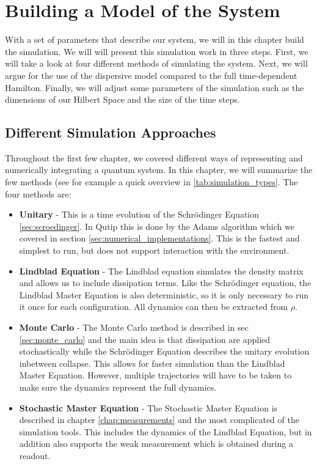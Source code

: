 \chapter{Building a Model of the System}\label{chap:model}
With a set of parameters that describe our system, we will in this chapter build  the simulation. We will will present this simulation work in three steps. First, we will take a look at four different methods of simulating the system. Next, we will argue for the use of the dispersive model compared to the full time-dependent Hamilton. Finally, we will adjust some parameters of the simulation such as the dimensions of our Hilbert Space and the size of the time steps.

\section{Different Simulation Approaches}
Throughout the first few chapter, we covered different ways of representing and numerically integrating a quantum system. In this chapter, we will summarize the few methods (see for example a quick overview in \ref{tab:simulation_types}. The four methods are:

\begin{itemize}
    \item \textbf{Unitary} - This is a time evolution of the Schrödinger Equation \ref{sec:scroedinger}. In Qutip this is done by the Adams algorithm which we covered in section \ref{sec:numerical_implementations}. This is the fastest and simplest to run, but does not support interaction with the environment.  
    \item \textbf{Lindblad Equation} - The Lindblad equation simulates the density matrix and allows us to include dissipation terms. Like the Schrödinger equation, the Lindblad Master Equation is also deterministic, so it is only necessary to run it once for each configuration. All dynamics can then be extracted from $\rho$. 
    \item \textbf{Monte Carlo} - The Monte Carlo method is described in sec \ref{sec:monte_carlo} and the main idea is that dissipation are applied stochastically while the Schrödinger Equation describes the unitary evolution inbetween collapse. This allows for faster simulation than the Lindblad Master Equation. However, multiple trajectories will have to be taken to make sure the dynamics represent the full dynamics.
    \item \textbf{Stochastic Master Equation} - The Stochastic Master Equation is described in chapter \ref{chap:measurements} and the most complicated of the simulation tools. This includes the dynamics of the Lindblad Equation, but in addition also supports the weak measurement which is obtained during a readout.
\end{itemize}

